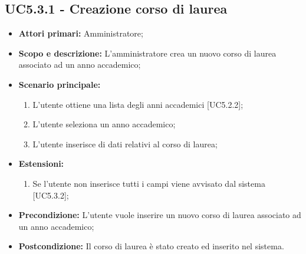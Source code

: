 \documentclass[AnalisiDeiRequisiti.tex]{subfiles}
\begin{document}
\subsection{UC5.3.1 - Creazione corso di laurea}
\begin{itemize}
	\item \textbf{Attori primari:} Amministratore;
	\item \textbf{Scopo e descrizione:} L'amministratore crea un nuovo corso di laurea associato ad un anno accademico;
	\item \textbf{Scenario principale:}
		\begin{enumerate}
			\item L'utente ottiene una lista degli anni accademici [UC5.2.2];
			\item L'utente seleziona un anno accademico;
			\item L'utente inserisce di dati relativi al corso di laurea;
		\end{enumerate}
	\item \textbf{Estensioni:}
		\begin{enumerate}
			\item Se l'utente non inserisce tutti i campi viene avvisato dal sistema [UC5.3.2];
		\end{enumerate}
	\item \textbf{Precondizione:} L'utente vuole inserire un nuovo corso di laurea associato ad un anno accademico; 
	\item \textbf{Postcondizione:} Il corso di laurea è stato creato ed inserito nel sistema.
\end{itemize}
\end{document}
